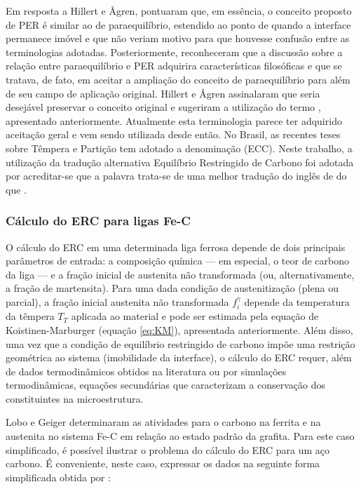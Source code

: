 Em resposta a Hillert e {\AA}gren,  pontuaram que, em essência, o conceito proposto de PER é similar ao de paraequilíbrio, estendido ao ponto de quando a interface permanece imóvel e que não veriam motivo para que houvesse confusão entre as terminologias adotadas. Posteriormente,  reconheceram que a discussão sobre a relação entre paraequilíbrio e PER adquirira características filosóficas e que se tratava, de fato, em aceitar a ampliação do conceito de paraequilíbrio para além de seu campo de aplicação original. Hillert e {\AA}gren assinalaram que seria desejável preservar o conceito original e sugeriram a utilização do termo , apresentado anteriormente. Atualmente esta terminologia parece ter adquirido aceitação geral e vem sendo utilizada desde então\cite{Edmonds2006, Speer2007}. 
No Brasil, as recentes teses sobre Têmpera e Partição tem adotado a denominação  (ECC)\cite{Martins2007, Coelho2008}. Neste trabalho, a utilização da tradução alternativa Equilíbrio Restringido de Carbono foi adotada por acreditar-se que a palavra  trata-se de uma melhor tradução do inglês de  do que .

\subsubsection{Cálculo do ERC para ligas Fe-C}

\label{subsubsec:ERC}

O cálculo do ERC em uma determinada liga ferrosa depende de dois principais parâmetros de entrada: a composição química --- em especial, o teor de carbono da liga --- e a fração inicial de austenita não transformada (ou, alternativamente, a fração de martensita)\cite{Speer2003}. Para uma dada condição de austenitização (plena ou parcial), a fração inicial austenita não transformada $f_i^\gamma$ depende da temperatura da têmpera $T_T$ aplicada ao material e pode ser estimada pela equação de Koistinen-Marburger (equação \ref{eq:KM}), apresentada anteriormente. Além disso, uma vez que a condição de equilíbrio restringido de carbono impõe uma restrição geométrica ao sistema (imobilidade da interface), o cálculo do ERC requer, além de dados termodinâmicos obtidos na literatura ou por simulações termodinâmicas, equações secundárias que caracterizam a conservação dos constituintes na microestrutura.

Lobo e Geiger\cite{Lobo1976a,Lobo1976b} determinaram as atividades para o carbono na ferrita e na austenita no sistema Fe-C em relação ao estado padrão da grafita.
Para este caso simplificado, é possível ilustrar o problema do cálculo do ERC para um aço carbono. É conveniente, neste caso, expressar os dados na seguinte forma simplificada obtida por :

